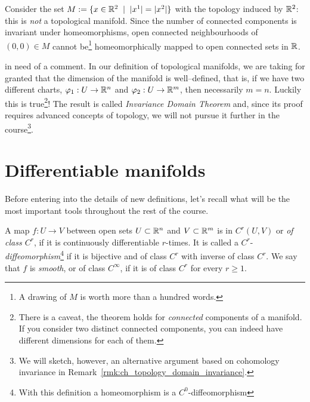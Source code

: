 \begin{example}
	Consider the set $M := \{ x\in\mathbb{R}^2 \;\mid\; |x^1| = |x^2| \}$ with the topology induced by $\mathbb{R}^2$:
	this is \emph{not} a topological manifold.
	Since the number of connected components is invariant under homeomorphisms, open connected neighbourhoods of $(0,0)\in M$ cannot be\footnote{A drawing of $M$ is worth more than a hundred words.} homeomorphically mapped to open connected sets in $\mathbb{R}$.
\end{example}

 in need of a comment.
In our definition of topological manifolds, we are taking for granted that the dimension of the manifold is well--defined, that is, if we have two different charts, $\varphi_1: U \to \mathbb{R}^n$ and $\varphi_2: U \to \mathbb{R}^m$, then necessarily $m=n$. Luckily this is true\footnote{There is a caveat, the theorem holds for \emph{connected} components of a manifold. If you consider two distinct connected components, you can indeed have different dimensions for each of them.}! The result is called \emph{Invariance Domain Theorem} and, since its proof requires advanced concepts of topology, we will not pursue it further in the course\footnote{We will sketch, however, an alternative argument based on cohomology invariance in Remark~\ref{rmk:ch_topology_domain_invariance}.}.

\section{Differentiable manifolds}

Before entering into the details of new definitions, let's recall what will be the most important tools throughout the rest of the course.

\begin{definition}
	A map $f: U \to V$ between open sets $U\subset\mathbb{R}^n$ and $V\subset\mathbb{R}^m$ is in $C^r(U,V)$ or \emph{of class $C^r$}, if it is continuously differentiable $r$-times.
	It is called a $C^r$-\emph{diffeomorphism}\footnote{With this definition a homeomorphism is a $C^0$-diffeomorphism} if it is bijective and of class $C^r$ with inverse of class $C^r$.
	We say that $f$ is \emph{smooth}, or of class $C^\infty$, if it is of class $C^r$ for every $r \geq 1$.
\end{definition}

